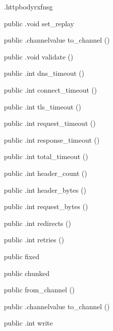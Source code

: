 \begin{CrexxClass}{.httpbody}{rxfnsg}
\begin{Members}
    \Method
      {public}
      {.void}
      {set\_replay}
      {}

    \Method
      {public}
      {.channelvalue}
      {to\_channel}
      {()}

    \Method
      {public}
      {.void}
      {validate}
      {()}

    \Method
      {public}
      {.int}
      {dns\_timeout}
      {()}

    \Method
      {public}
      {.int}
      {connect\_timeout}
      {()}

    \Method
      {public}
      {.int}
      {tls\_timeout}
      {()}

    \Method
      {public}
      {.int}
      {request\_timeout}
      {()}

    \Method
      {public}
      {.int}
      {response\_timeout}
      {()}

    \Method
      {public}
      {.int}
      {total\_timeout}
      {()}

    \Method
      {public}
      {.int}
      {header\_count}
      {()}

    \Method
      {public}
      {.int}
      {header\_bytes}
      {()}

    \Method
      {public}
      {.int}
      {request\_bytes}
      {()}

    \Method
      {public}
      {.int}
      {redirects}
      {()}

    \Method
      {public}
      {.int}
      {retries}
      {()}

    \Factory
      {public}
      {fixed}
      {}

    \Factory
      {public}
      {chunked}
      {}

    \Factory
      {public}
      {from\_channel}
      {()}

    \Method
      {public}
      {.channelvalue}
      {to\_channel}
      {()}

    \Method
      {public}
      {.int}
      {write}
      {}


\end{Members}
\end{CrexxClass}
